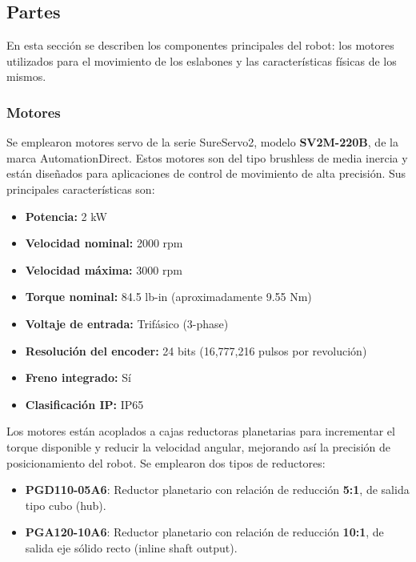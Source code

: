 \subsection{Partes} \label{subsec:partes}

En esta sección se describen los componentes principales del robot: los motores utilizados para el movimiento de los eslabones y las características físicas de los mismos.

\subsubsection{Motores} \label{subsubsec:motores}

Se emplearon motores servo de la serie SureServo2, modelo \textbf{SV2M-220B}, de la marca AutomationDirect. Estos motores son del tipo brushless de media inercia y están diseñados para aplicaciones de control de movimiento de alta precisión. Sus principales características son:

\begin{itemize}
	\item \textbf{Potencia:} 2 kW
	\item \textbf{Velocidad nominal:} 2000 rpm
	\item \textbf{Velocidad máxima:} 3000 rpm
	\item \textbf{Torque nominal:} 84.5 lb-in (aproximadamente 9.55 Nm)
	\item \textbf{Voltaje de entrada:} Trifásico (3-phase)
	\item \textbf{Resolución del encoder:} 24 bits (16,777,216 pulsos por revolución)
	\item \textbf{Freno integrado:} Sí
	\item \textbf{Clasificación IP:} IP65
\end{itemize}

Los motores están acoplados a cajas reductoras planetarias para incrementar el torque disponible y reducir la velocidad angular, mejorando así la precisión de posicionamiento del robot. Se emplearon dos tipos de reductores:

\begin{itemize}
	\item \textbf{PGD110-05A6}: Reductor planetario con relación de reducción \textbf{5:1}, de salida tipo cubo (hub).
	\item \textbf{PGA120-10A6}: Reductor planetario con relación de reducción \textbf{10:1}, de salida eje sólido recto (inline shaft output).
\end{itemize}


